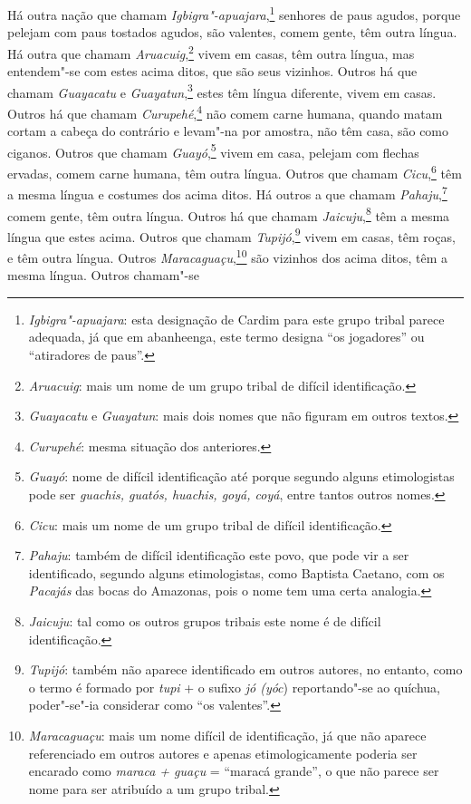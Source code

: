  Há outra nação que chamam \textit{Igbigra"-apuajara},\footnote{ \textit{Igbigra"-apuajara}: 
esta designação de Cardim para este grupo
tribal parece adequada, já que em abanheenga, este termo designa ``os
jogadores'' ou ``atiradores de paus''.} senhores de
paus agudos, porque pelejam com paus tostados agudos, são valentes,
comem gente, têm outra língua. Há outra que chamam 
\textit{Aruacuig},\footnote{ \textit{Aruacuig}: mais um nome de um grupo tribal de
difícil identificação.} vivem em casas, têm outra língua, mas
entendem"-se com estes acima ditos, que são seus vizinhos. Outros há que
chamam \textit{Guayacatu} e \textit{Guayatun},\footnote{ \textit{Guayacatu} 
e \textit{Guayatun}: mais dois nomes que não
figuram em outros textos.} estes têm língua diferente, vivem
em casas. Outros há que chamam \textit{Curupehé},\footnote{ \textit{Curupehé}: 
mesma situação dos anteriores.} não comem
carne humana, quando matam cortam a cabeça do contrário e levam"-na por
amostra, não têm casa, são como ciganos. Outros que chamam
\textit{Guayó},\footnote{ \textit{Guayó}: nome de difícil
identificação até porque segundo alguns etimologistas pode ser
\textit{guachis, guatós, huachis, goyá, coyá}, entre tantos outros
nomes.} vivem em casa, pelejam com flechas ervadas, comem
carne humana, têm outra língua. Outros que chamam \textit{Cicu},\footnote{ \textit{Cicu}: 
mais um nome de um grupo tribal de difícil 
identificação.} têm a mesma língua e costumes dos acima ditos.
Há outros a que chamam \textit{Pahaju},\footnote{ \textit{Pahaju}: 
também de difícil identificação este povo, que pode vir a ser
identificado, segundo alguns etimologistas, como Baptista Caetano, com
os \textit{Pacajás} das bocas do Amazonas, pois o nome tem uma certa
analogia.} comem gente, têm outra língua. Outros há que chamam
\textit{Jaicuju},\footnote{ \textit{Jaicuju}: tal como os outros
grupos tribais este nome é de difícil identificação.} têm a
mesma língua que estes acima. Outros que chamam 
\textit{Tupijó},\footnote{ \textit{Tupijó}: também não aparece identificado em outros
autores, no entanto, como o termo é formado por \textit{tupi} + o
sufixo \textit{jó (yóc}) reportando"-se ao quíchua, poder"-se"-ia
considerar como ``os valentes''.} vivem em casas, têm roças, e
têm outra língua. Outros \textit{Maracaguaçu},\footnote{ \textit{Maracaguaçu}: 
mais um nome difícil de identificação, já que não
aparece referenciado em outros autores e apenas etimologicamente
poderia ser encarado como \textit{maraca + guaçu} = ``maracá grande'', o
que não parece ser nome para ser atribuído a um grupo tribal.} 
são vizinhos dos acima ditos, têm a mesma língua. Outros chamam"-se
